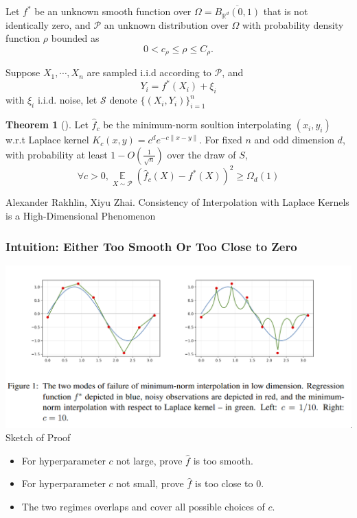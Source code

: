 \documentclass{beamer}   	%
\theoremstyle{definition}
\newtheorem*{thm}{Theorem}
\begin{document}
\begin{frame}
	Let $f^*$ be an unknown smooth function over $\Omega=\overline{B_{\mathbb{R}^d}(0,1)}$ that is not identically zero, and $\mathcal{P}$ an unknown distribution over $\Omega$ with probability density function $\rho$ bounded as
	\begin{equation}
		0< c_ \rho\le \rho\le C_ \rho.
	\end{equation}

	Suppose $X_1,\cdots,X_n$ are sampled i.i.d according to $\mathcal{P}$, and
	\begin{equation}
		Y_i=f^*(X_i)+\xi_i
	\end{equation}
	with $\xi_i$ i.i.d. noise, let $\mathcal{S}$ denote $\{(X_i,Y_i)\}_{i=1}^n$

	\begin{thm}[\cite{cint}]
		Let $\hat{f}_c$ be the minimum-norm soultion interpolating $(x_i,y_i)$ w.r.t Laplace kernel $K_c(x,y)= c^d e^{-c\|x-y\|}$. For fixed $n$ and odd dimension $d$, with probability at least $1-O(\frac{1}{\sqrt{n}})$ over the draw of $S$,
		\begin{equation}
			\forall c> 0,\mathop{\mathbb{E}}\limits_{X\sim \mathcal{P}}\left(
			\hat{f}_c(X)-f^*(X)\right)^2\ge \Omega_d(1)
		\end{equation}
	\end{thm}
\begin{thebibliography}{9}
\scriptsize
{}

Alexander Rakhlin, Xiyu Zhai. Consistency of Interpolation with Laplace Kernels is a High-Dimensional Phenomenon
\end{thebibliography}
\end{frame}

\begin{frame}
\frametitle{Intuition: Either Too Smooth Or Too Close to Zero}
\includegraphics[width=\linewidth]{int_intuition.png}
Sketch of Proof
\begin{itemize}
	\item For hyperparameter $c$ not large, prove $\hat{f}$ is too smooth.
	\item For hyperparameter $c$ not small, prove $\hat{f}$ is too close to $0$.
	\item The two regimes overlaps and cover all possible choices of $c$.
\end{itemize}
\end{frame}
\end{document}

